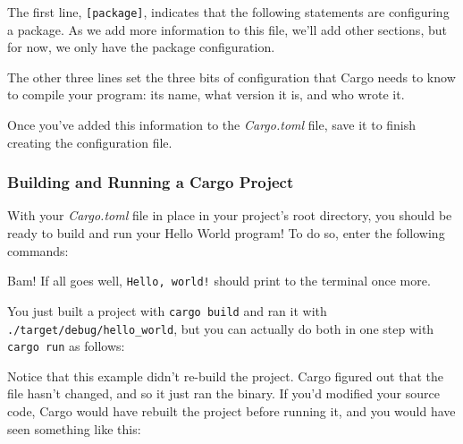 \documentclass[a4paper,]{book}
\newenvironment{Shaded}{\begin{snugshade}}{\end{snugshade}}
\newcommand{\KeywordTok}[1]{\textcolor[rgb]{0.13,0.29,0.53}{\textbf{{#1}}}}
\newcommand{\NormalTok}[1]{{#1}}
\begin{document}
The first line, \texttt{{[}package{]}}, indicates that the following
statements are configuring a package. As we add more information to this
file, we'll add other sections, but for now, we only have the package
configuration.

The other three lines set the three bits of configuration that Cargo
needs to know to compile your program: its name, what version it is, and
who wrote it.

Once you've added this information to the \emph{Cargo.toml} file, save
it to finish creating the configuration file.

\subsubsection{Building and Running a Cargo
Project}\label{building-and-running-a-cargo-project}

With your \emph{Cargo.toml} file in place in your project's root
directory, you should be ready to build and run your Hello World
program! To do so, enter the following commands:

\begin{Shaded}
\end{Shaded}

Bam! If all goes well, \texttt{Hello,\ world!} should print to the
terminal once more.

You just built a project with \texttt{cargo\ build} and ran it with
\texttt{./target/debug/hello\_world}, but you can actually do both in
one step with \texttt{cargo\ run} as follows:

\begin{Shaded}
\end{Shaded}

Notice that this example didn't re-build the project. Cargo figured out
that the file hasn't changed, and so it just ran the binary. If you'd
modified your source code, Cargo would have rebuilt the project before
running it, and you would have seen something like this:
\end{document}
